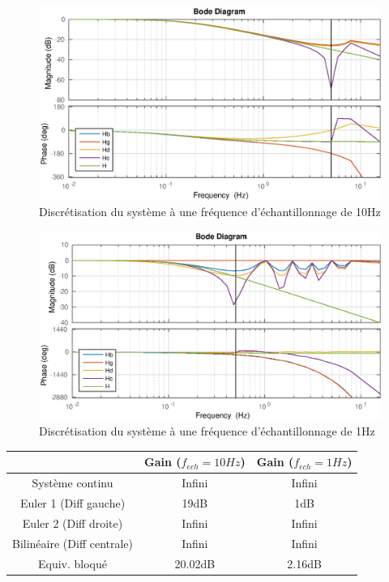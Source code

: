 \begin{figure}[!h]
\centering\includegraphics[scale=.9]{eps/labo1-comp-bode-0-1}
\caption{Discrétisation du système à une fréquence d'échantillonnage de 10Hz}
\label{labo1-comp-bode-10}
\end{figure}
\begin{figure}[!h]
\centering\includegraphics[scale=.9]{eps/labo1-comp-bode-1}
\caption{Discrétisation du système à une fréquence d'échantillonnage de 1Hz}
\label{labo1-comp-bode-1}
\end{figure}

\begin{table}[!h]\centering
\begin{tabular}{|c|c|c|}
\hline
 & Gain ($f_{ech}=10Hz$) & Gain ($f_{ech}=1Hz$) \\
\hline Système continu & Infini & Infini \\
\hline
Euler 1 (Diff gauche) & 19dB & 1dB\\
\hline
Euler 2 (Diff droite) & Infini & Infini \\
\hline
Bilinéaire (Diff centrale) & Infini & Infini \\
\hline
Equiv. bloqué & 20.02dB & 2.16dB\\
\hline
\end{tabular}
\end{table}

